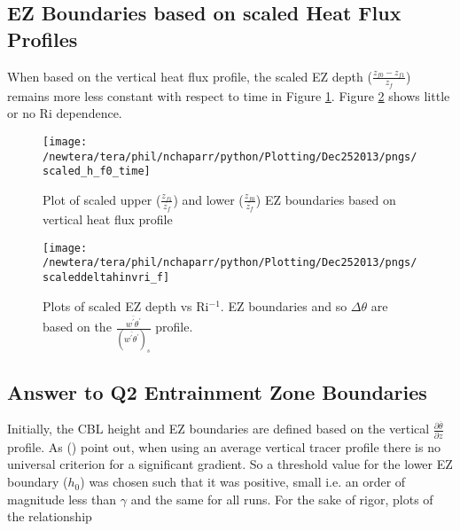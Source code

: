\clearpage

\subsection{\acs{EZ} Boundaries based on scaled Heat Flux Profiles}

When based on the vertical heat flux profile, the scaled \acs{EZ} depth ($\frac{z_{f0}-z_{f1}}{z_{f}}$) remains more less constant with respect to time in Figure \ref{fig:scaledEZlims1}. Figure \ref{fig:deltahinvri_scaled} shows little or no \acs{Ri} dependence. 

\begin{figure}[htbp]
    \centering
\texttt{[image: /newtera/tera/phil/nchaparr/python/Plotting/Dec252013/pngs/scaled\_h\_f0\_time]}              
\caption[Scaled \acs{EZ} Boundaries based on the vertical heat flux profile]{Plot of scaled upper ($\frac{z_{f1}}{z_{f}}$) and lower ($\frac{z_{f0}}{z_{f}}$) \acs{EZ} boundaries based on vertical heat flux profile}
    \label{fig:scaledEZlims1}   %
\end{figure}

\begin{figure}[htbp]
    \centering
    \texttt{[image: /newtera/tera/phil/nchaparr/python/Plotting/Dec252013/pngs/scaleddeltahinvri\_f]}
    \caption[scaled \acs{EZ} depth vs \acs{Ri}$^{-1}$ based on the vertical heat flux profile]{Plots of scaled \acs{EZ} depth vs \acs{Ri}$^{-1}$. \acs{EZ} boundaries and so $\Delta \theta$ are based on the $\frac{\overline{w^{'}\theta^{'}}}{(\overline{w^{'}\theta^{'}})_{s}}$ profile.}
    \label{fig:deltahinvri_scaled}   %
\end{figure}

\clearpage

\subsection{Answer to Q2 Entrainment Zone Boundaries}

Initially, the \acs{CBL} height and \acs{EZ} boundaries are defined based on the vertical  $\frac{\partial \overline{\theta}}{\partial z}$ profile.  As \citeauthor{BrooksFowler2} (\citeyear{BrooksFowler2}) point out, when using an average vertical tracer profile there is no universal criterion for a significant gradient.  So a threshold value for the lower \acs{EZ} boundary ($h_{0}$) was chosen such that it was positive, small i.e. an order of magnitude less than $\gamma$ and the same for all runs.  For the sake of rigor, plots of the relationship

